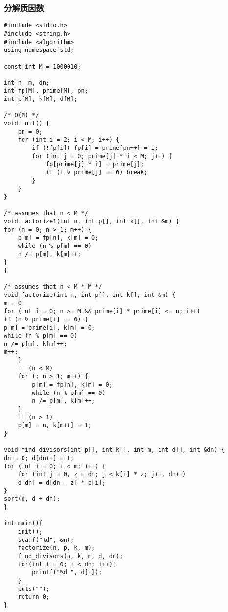 \subsubsection{分解质因数}
\begin{verbatim}
#include <stdio.h>
#include <string.h>
#include <algorithm>
using namespace std;

const int M = 1000010;

int n, m, dn;
int fp[M], prime[M], pn;
int p[M], k[M], d[M];

/* O(M) */
void init() {
    pn = 0;
    for (int i = 2; i < M; i++) {
        if (!fp[i]) fp[i] = prime[pn++] = i;
        for (int j = 0; prime[j] * i < M; j++) {
            fp[prime[j] * i] = prime[j];
            if (i % prime[j] == 0) break;
        }
    }
}

/* assumes that n < M */
void factorize1(int n, int p[], int k[], int &m) {
for (m = 0; n > 1; m++) {
    p[m] = fp[n], k[m] = 0;
    while (n % p[m] == 0) 
    n /= p[m], k[m]++;
}
}

/* assumes that n < M * M */
void factorize(int n, int p[], int k[], int &m) {
m = 0;
for (int i = 0; n >= M && prime[i] * prime[i] <= n; i++)
if (n % prime[i] == 0) {
p[m] = prime[i], k[m] = 0;
while (n % p[m] == 0)
n /= p[m], k[m]++;
m++;
    }
    if (n < M)
    for (; n > 1; m++) {
        p[m] = fp[n], k[m] = 0;
        while (n % p[m] == 0) 
        n /= p[m], k[m]++;
    }
    if (n > 1)
    p[m] = n, k[m++] = 1;
}

void find_divisors(int p[], int k[], int m, int d[], int &dn) {
dn = 0; d[dn++] = 1;
for (int i = 0; i < m; i++) {
    for (int j = 0, z = dn; j < k[i] * z; j++, dn++)
    d[dn] = d[dn - z] * p[i];
}
sort(d, d + dn);
}

int main(){
    init();
    scanf("%d", &n);
    factorize(n, p, k, m);
    find_divisors(p, k, m, d, dn);
    for(int i = 0; i < dn; i++){
        printf("%d ", d[i]);
    }
    puts("");
    return 0;
}
\end{verbatim}
